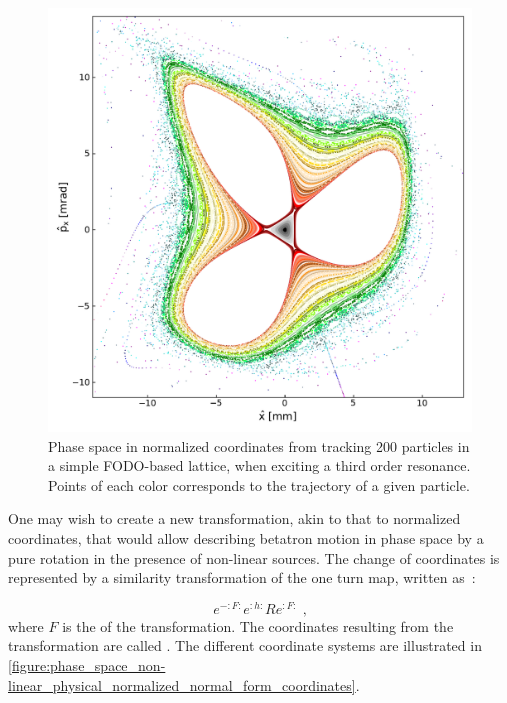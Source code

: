 \begin{figure}[!htb]
    \centering
    \includegraphics[width = 0.9\linewidth]{Figures/Beam_Dynamics_Theory/phase_space_third_order_resonance.pdf}
    \caption{Phase space in normalized coordinates from tracking \num{200} particles in a simple FODO-based lattice, when exciting a third order resonance. Points of each color corresponds to the trajectory of a given particle. }
    \label{figure:phase_space_third_order_resonance}
\end{figure}

One may wish to create a new transformation, akin to that to normalized coordinates, that would allow describing betatron motion in phase space by a pure rotation in the presence of non-linear sources.
The change of coordinates is represented by a similarity transformation of the one turn map, written as~\cite{PHD:Tomas}:

\begin{equation}
    e^{-:F:} e^{:h:} R e^{:F:} \text{ ,}
    \label{equation:normal_form_transformation}
\end{equation}
where \(F\) is the  of the transformation.
The coordinates resulting from the transformation are called .
The different coordinate systems are illustrated in \cref{figure:phase_space_non-linear_physical_normalized_normal_form_coordinates}.

